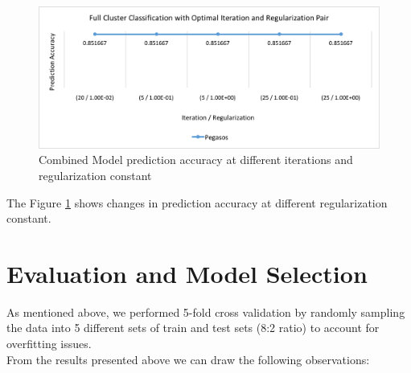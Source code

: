 \documentclass[11pt,letterpaper]{article}
\begin{document}
\begin{figure}
  \includegraphics[width=\linewidth]{full_optimal_pair.png}
  \caption{Combined Model prediction accuracy at different iterations and regularization constant}
  \label{fig:graph7}
\end{figure}

The Figure \ref{fig:graph7} shows changes in prediction accuracy at different regularization constant.

\section{Evaluation and Model Selection}

As mentioned above, we performed 5-fold cross validation by randomly sampling the data into 5 different sets of train and test sets (8:2 ratio) to account for overfitting issues.\\

From the results presented above we can draw the following observations:
\end{document}
